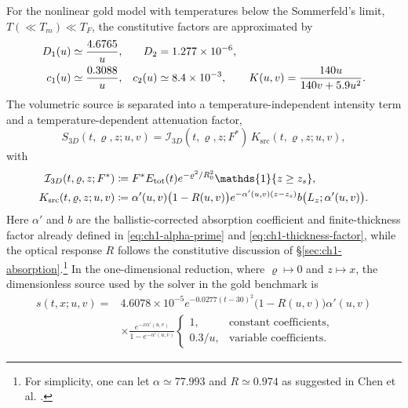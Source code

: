 For the nonlinear gold model with temperatures below the Sommerfeld's limit, $T (\ll T_m) \ll T_F$, the constitutive factors are approximated by
\begin{align}
    D_1(u) & \simeq \frac{4.6765}{u},          &
    D_2    & = 1.277 \times 10^{-6}, \notag      \\
    c_1(u) & \simeq \frac{0.3088}{u},          &
    c_2(u) & \simeq 8.4 \times 10^{-3}, \qquad
    K(u,v) = \frac{140u}{140v + 5.9u^2}. \label{eq:ch2-variable-params}
\end{align}
The volumetric source is separated into a temperature-independent intensity term and a temperature-dependent attenuation factor,
\begin{equation}
    \label{eq:ch2-source-decomp}
    S_{3D}(t,\varrho,z;u,v) = \mathcal{I}_{3D}(t,\varrho,z;F^*) \, K_{\mathrm{src}}(t,\varrho,z;u,v),
\end{equation}
with
\begin{align}
    \mathcal{I}_{3D}(t,\varrho,z;F^*) & \coloneqq F^* E_{\mathrm{tot}}(t) e^{-\varrho^2/R_0^2} \mathds{1}\{z \ge z_s\}, \notag            \\
    K_{\mathrm{src}}(t,\varrho,z;u,v) & \coloneqq \alpha'(u,v)\bigl(1-R(u,v)\bigr)e^{-\alpha'(u,v)(z-z_s)} b\bigl(L_z;\alpha'(u,v)\bigr).
\end{align}
Here $\alpha'$ and $b$ are the ballistic-corrected absorption coefficient and finite-thickness factor already defined in \eqref{eq:ch1-alpha-prime} and \eqref{eq:ch1-thickness-factor},
while the optical response $R$ follows the constitutive discussion of \S\ref{sec:ch1-absorption}.\footnote{For simplicity, one can let $\alpha \simeq 77.993$ and $R \simeq 0.974$ as suggested in Chen et al. \cite{Chen_2010}.}
In the one-dimensional reduction, where $\varrho \mapsto 0$ and $z \mapsto x$, the dimensionless source used by the solver in the gold benchmark is
\begin{equation}
    \begin{aligned}
        s(t,x;u,v) = {} & 4.6078 \times 10^{-5} e^{-0.0277(t-30)^2}
        \bigl(1-R(u,v)\bigr)\alpha'(u,v)                                        \\
                        & \times \frac{e^{-x\alpha'(u,v)}}{1-e^{-\alpha'(u,v)}}
        \begin{cases}
            1,     & \text{constant coefficients}, \\
            0.3/u, & \text{variable coefficients}.
        \end{cases}
    \end{aligned}
\end{equation}

